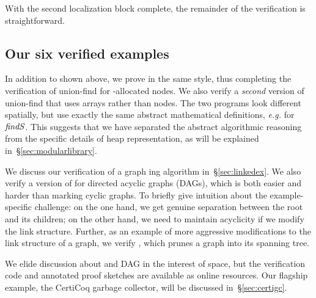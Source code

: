 With the second localization block complete, the remainder of the verification is straightforward.


\subsection{Our six verified examples}
\label{sec:application}

In addition to  shown above, we prove 
in the same style, thus completing the verification of 
union-find for -allocated nodes.
We also verify a \emph{second} version of union-find that uses
arrays rather than nodes. The two programs look different spatially, but 
use exactly the same abstract mathematical definitions,
\emph{e.g.} for $\mathit{findS}$. 
This suggests that we have separated the abstract algorithmic 
reasoning from the specific details of heap representation, as will be explained
in~\S\ref{sec:modularlibrary}.

We discuss our verification of a graph ing algorithm 
in~\S\ref{sec:linkedex}. We also verify a version of  
for directed acyclic graphs (DAGs), which is both easier and harder than 
marking cyclic graphs. To briefly give intuition about the example-specific 
challenge: on the one hand, we get genuine separation
between the root and its children; on the other hand, we need to maintain acyclicity if
we modify the link structure.
Further, as an example of more aggressive modifications to the link structure 
of a graph, we verify , which prunes a graph into its 
spanning tree. 

We elide discussion about  and DAG  
in the interest of space, but the verification code and annotated proof sketches 
are available as online resources.
Our flagship example, the CertiCoq garbage collector, will be discussed in~\S\ref{sec:certigc}.


